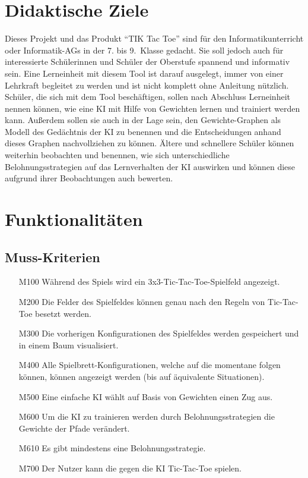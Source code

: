 \documentclass[titlepage]{scrartcl}
\newcommand{\TicTacToe}{TI\reflectbox K Tac Toe}
\begin{document}
\section{Didaktische Ziele}
Dieses Projekt und das Produkt "`\TicTacToe"' sind für den Informatikunterricht oder Informatik-AGs in der 7. bis 9.\ Klasse gedacht.
Sie soll jedoch auch für interessierte Schülerinnen und Schüler der Oberstufe spannend und informativ sein.
Eine Lerneinheit mit diesem Tool ist darauf ausgelegt, immer von einer Lehrkraft begleitet zu werden und ist nicht komplett ohne Anleitung nützlich.
Schüler, die sich mit dem Tool beschäftigen, sollen nach Abschluss Lerneinheit nennen können, wie eine KI mit Hilfe von Gewichten lernen und trainiert werden kann.
Außerdem sollen sie auch in der Lage sein, den Gewichte-Graphen als Modell des Gedächtnis der KI zu benennen und die Entscheidungen anhand dieses Graphen nachvollziehen zu können.
Ältere und schnellere Schüler können weiterhin beobachten und benennen,
wie sich unterschiedliche Belohnungsstrategien auf das Lernverhalten der KI auswirken und können diese aufgrund ihrer Beobachtungen auch bewerten.

\section{Funktionalitäten}%
\subsection{Muss-Kriterien}
	\begin{itemize}
		\item[M100] Während des Spiels wird ein 3x3-Tic-Tac-Toe-Spielfeld angezeigt.
		\item[M200] Die Felder des Spielfeldes können genau nach den Regeln von Tic-Tac-Toe besetzt werden.
		\item[M300] Die vorherigen Konfigurationen des Spielfeldes werden gespeichert und in einem Baum visualisiert.
		\item[M400] Alle Spielbrett-Konfigurationen, welche auf die momentane folgen können, können angezeigt werden (bis auf äquivalente Situationen).
		\item[M500] Eine einfache KI wählt auf Basis von Gewichten einen Zug aus.
		\item[M600] Um die KI zu trainieren werden durch Belohnungsstrategien die Gewichte der Pfade verändert.
		\item[M610] Es gibt mindestens eine Belohnungsstrategie.
		\item[M700] Der Nutzer kann die gegen die KI Tic-Tac-Toe spielen.
	\end{itemize}
\end{document}

